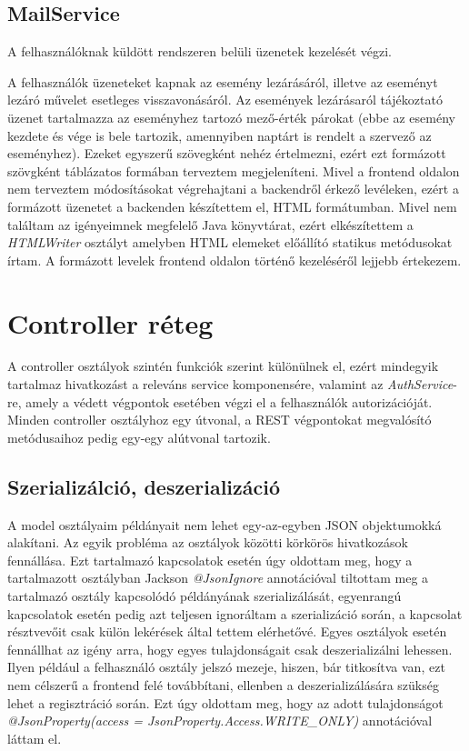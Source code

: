 \documentclass[a4paper,12pt]{report}
\theoremstyle{definition}
\theoremstyle{remark}
\begin{document}
\subsection{MailService}

A felhasználóknak küldött rendszeren belüli üzenetek kezelését végzi.

A felhasználók üzeneteket kapnak az esemény lezárásáról, illetve az eseményt lezáró művelet esetleges visszavonásáról. Az események lezárásaról tájékoztató üzenet tartalmazza az eseményhez tartozó mező-érték párokat (ebbe az esemény kezdete és vége is bele tartozik, amennyiben naptárt is rendelt a szervező az eseményhez). Ezeket egyszerű szövegként nehéz értelmezni, ezért ezt formázott szövgként táblázatos formában terveztem megjeleníteni. Mivel a frontend oldalon nem terveztem módosításokat végrehajtani a backendről érkező levéleken, ezért a formázott üzenetet a backenden készítettem el, HTML formátumban. Mivel nem találtam az igényeimnek megfelelő Java könyvtárat, ezért elkészítettem a \textit{HTMLWriter} osztályt amelyben HTML elemeket előállító statikus metódusokat írtam. A formázott levelek frontend oldalon történő kezeléséről lejjebb értekezem.

\section{Controller réteg}

A controller osztályok szintén funkciók szerint különülnek el, ezért mindegyik tartalmaz hivatkozást a releváns service komponensére, valamint az \textit{AuthService}-re, amely a védett végpontok esetében végzi el a felhasználók autorizációját. Minden controller osztályhoz egy útvonal, a REST végpontokat megvalósító metódusaihoz pedig egy-egy alútvonal tartozik.

\subsection{Szerializálció, deszerializáció}

A model osztályaim példányait nem lehet egy-az-egyben JSON objektumokká alakítani. Az egyik probléma az osztályok közötti körkörös hivatkozások fennállása. Ezt tartalmazó kapcsolatok esetén úgy oldottam meg, hogy a tartalmazott osztályban Jackson \textit{@JsonIgnore} annotációval tiltottam meg a tartalmazó osztály kapcsolódó példányának szerializálását, egyenrangú kapcsolatok esetén pedig azt teljesen ignoráltam a szerializáció során, a kapcsolat résztvevőit csak külön lekérések által tettem elérhetővé. Egyes osztályok esetén fennállhat az igény arra, hogy egyes tulajdonságait csak deszerializálni lehessen. Ilyen például a felhasználó osztály jelszó mezeje, hiszen, bár titkosítva van, ezt nem célszerű a frontend felé továbbítani, ellenben a deszerializálására szükség lehet a regisztráció során. Ezt úgy oldottam meg, hogy az adott tulajdonságot \textit{@JsonProperty(access = JsonProperty.Access.WRITE\_ONLY)} annotációval láttam el.
\end{document}
